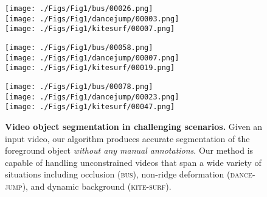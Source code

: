 \documentclass[runningheads]{llncs}
\newcommand{\tb}[1]{\textbf{#1}}
\begin{document}
\begin{figure}[t!]
\centering
\begin{minipage}{0.325\linewidth}\centering
\texttt{[image: ./Figs/Fig1/bus/00026.png]} \\
\texttt{[image: ./Figs/Fig1/dancejump/00003.png]} \\
\texttt{[image: ./Figs/Fig1/kitesurf/00007.png]}
\end{minipage}
\begin{minipage}{0.325\linewidth}\centering
\texttt{[image: ./Figs/Fig1/bus/00058.png]} \\
\texttt{[image: ./Figs/Fig1/dancejump/00007.png]} \\
\texttt{[image: ./Figs/Fig1/kitesurf/00019.png]}
\end{minipage}
\begin{minipage}{0.325\linewidth}\centering
\texttt{[image: ./Figs/Fig1/bus/00078.png]} \\
\texttt{[image: ./Figs/Fig1/dancejump/00023.png]} \\
\texttt{[image: ./Figs/Fig1/kitesurf/00047.png]}
\end{minipage}
\caption{\tb{Video object segmentation in challenging scenarios.} Given an input video, our algorithm produces accurate segmentation of the foreground object \emph{without any manual annotations}. Our method is capable of handling unconstrained videos that span a wide variety of situations including occlusion (\textsc{bus}),  non-ridge deformation (\textsc{dance-jump}), and dynamic background (\textsc{kite-surf}).
}
\label{fig:Teaser}
\end{figure} 
\end{document}
